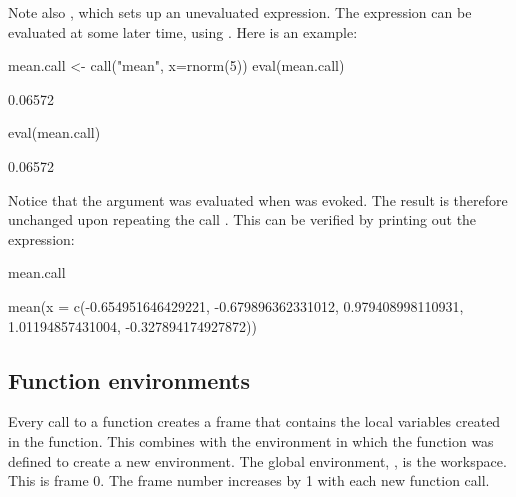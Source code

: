 Note also , which sets up an unevaluated expression.
The expression can be evaluated at some later time, using .
Here is an example:
\begin{Schunk}
\begin{Sinput}
mean.call <- call("mean", x=rnorm(5))
eval(mean.call)
\end{Sinput}
\begin{Soutput}
[1] 0.06572
\end{Soutput}
\begin{Sinput}
eval(mean.call)
\end{Sinput}
\begin{Soutput}
[1] 0.06572
\end{Soutput}
\end{Schunk}
Notice that the argument  was evaluated when 
was evoked. The result is therefore unchanged upon repeating the
call . This can be verified by printing out the
expression:
\begin{fullwidth}

\begin{Schunk}
\begin{Sinput}
mean.call
\end{Sinput}
\begin{Soutput}
mean(x = c(-0.654951646429221, -0.679896362331012, 0.979408998110931, 
1.01194857431004, -0.327894174927872))
\end{Soutput}
\end{Schunk}

\end{fullwidth}

\subsection{Function environments}
Every call to a function creates a frame that contains the local
variables created in the function. This combines with the environment
in which the function was defined to create a new environment.
The global environment, , is the workspace.  This
is frame 0. The frame number increases by 1 with each new function
call.

